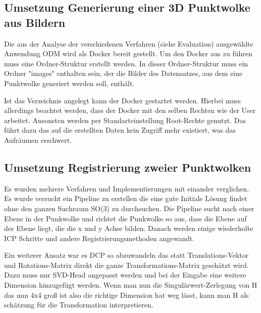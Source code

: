 \documentclass[12pt,titlepage, twoside]{article}
\begin{document}
\subsection{Umsetzung Generierung einer 3D Punktwolke aus Bildern}
\label{sec:realisierung:implementierung1}

Die aus der Analyse der verschiedenen Verfahren (siehe Evaluation) ausgewählte Anwendung ODM wird als Docker bereit gestellt. Um den Docker aus zu führen muss eine Ordner-Struktur erstellt werden.
In dieser Ordner-Struktur muss ein Ordner "images" enthalten sein, der die Bilder des Datensatzes, aus dem eine Punktwolke generiert werden soll, enthält.

Ist das Verzeichnis angelegt kann der Docker gestartet werden. Hierbei muss allerdings beachtet werden, dass der Docker mit den selben Rechten wie der User arbeitet. Ansonsten werden per Standarteinstellung Root-Rechte genutzt.
Das führt dazu das auf die erstellten Daten kein Zugriff mehr existiert, was das Aufräumen erschwert.

\subsection{Umsetzung Registrierung zweier Punktwolken}
\label{sec:realisierung:implementierung2}

Es wurden mehrere Verfahren und Implementierungen mit einander verglichen. Es wurde versucht ein Pipeline zu erstellen die eine gute Initiale Lösung findet ohne den ganzen Suchraum SO(3) zu durchsuchen.
Die Pipeline sucht nach einer Ebene in der Punkwolke und richtet die Punkwolke so aus, dass die Ebene auf der Ebene liegt, die die x und y Achse bilden. Danach werden einige wiederholte ICP Schritte und andere Registrierungsmethoden angewandt.

Ein weiterer Ansatz war es DCP so abzuwandeln das statt Translations-Vektor und Rotations-Matrix direkt die ganze Transformations-Matrix geschätzt wird. Dazu muss nur SVD-Head angepasst werden 
und bei der Eingabe eine weitere Dimension hinzugefügt werden. Wenn man nun die Singulärwert-Zerlegung von H das nun 4x4 groß ist also die richtige Dimension hat weg lässt, kann man H als schätzung für die Transformation interpretieren.
\end{document}

